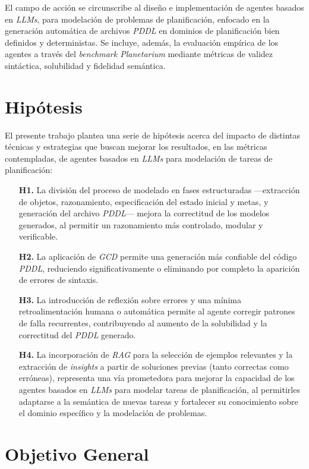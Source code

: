 El campo de acción se circunscribe al diseño e implementación de agentes basados en \textit{LLMs}, para modelación de problemas de planificación, enfocado en la generación automática de archivos \textit{PDDL} en dominios de planificación bien definidos y deterministas. Se incluye, además, la evaluación empírica de los agentes a través del \textit{benchmark Planetarium} mediante métricas de validez sintáctica, solubilidad y fidelidad semántica.

\section*{Hipótesis}
El presente trabajo plantea una serie de hipótesis acerca del impacto de distintas técnicas y estrategias que buscan mejorar los resultados, en las métricas contempladas, de agentes basados en \textit{LLMs} para modelación de tareas de planificación:

\begin{itemize}
    \item[\textbf{H1.}] La división del proceso de modelado en fases estructuradas —extracción de objetos, razonamiento, especificación del estado inicial y metas, y generación del archivo \textit{PDDL}— mejora la correctitud de los modelos generados, al permitir un razonamiento más controlado, modular y verificable.
    \item[\textbf{H2.}] La aplicación de \textit{GCD}  permite una generación más confiable del código \textit{PDDL}, reduciendo significativamente o eliminando por completo la aparición de errores de sintaxis.
    \item[\textbf{H3.}] La introducción de reflexión sobre errores y una mínima retroalimentación humana o automática permite al agente corregir patrones de falla recurrentes, contribuyendo al aumento de la solubilidad y la correctitud del \textit{PDDL} generado.
    \item[\textbf{H4.}] La incorporación de \textit{RAG} para la selección de ejemplos relevantes y la extracción de \textit{insights} a partir de soluciones previas (tanto correctas como erróneas), representa una vía prometedora para mejorar la capacidad de los agentes basados en \textit{LLMs} para modelar tareas de planificación, al permitirles adaptarse a la semántica de nuevas tareas y fortalecer su conocimiento sobre el dominio específico y la modelación de problemas.
\end{itemize}

\section*{Objetivo General}


